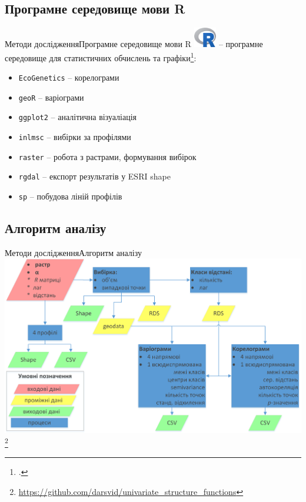 \documentclass[]{beamer}
\newcommand\blfootnote[1]{%
	\begingroup
	\renewcommand\thefootnote{}\footnote{#1}%
	\addtocounter{footnote}{-1}%
	\endgroup
}
\begin{document}
\subsection{Програмне середовище мови R}
\begin{frame}{Методи дослідження}{Програмне середовище мови R}
\includegraphics[width=1.0cm]{./pres_figures/R_logo.png} -- програмне середовище для статистичних обчислень та графіки\footcites{Rcite2017}{EcoGenetics2017}{geoR2016}{Wickham2009}{inlmisc2017}{raster2016}{rgdal2017}{Pebesma2005}{Bivand2013}:
\begin{itemize}
	\item \texttt{EcoGenetics} -- корелограми
	\item \texttt{geoR} -- варіограми
	\item \texttt{ggplot2} -- аналітична візуаліація
	\item \texttt{inlmsc} -- вибірки за профілями
	\item \texttt{raster} -- робота з растрами, формування вибірок
	\item \texttt{rgdal} -- експорт результатів у ESRI shape
	\item \texttt{sp} -- побудова ліній профілів
\end{itemize}
\end{frame}

\subsection{Алгоритм аналізу}
\begin{frame}{Методи дослідження}{Алгоритм аналізу}
\includegraphics[width=\textwidth]{./pres_figures/algorithm_flowchart.png}
\blfootnote{\href{https://github.com/darsvid/univariate_structure_functions}{ https://github.com/darsvid/univariate\_structure\_functions}}
\end{frame}
\end{document}
